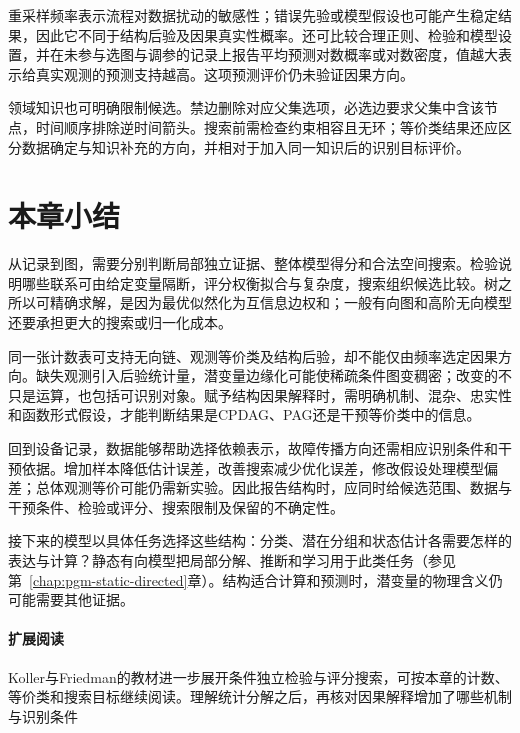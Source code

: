重采样频率表示流程对数据扰动的敏感性；错误先验或模型假设也可能产生稳定结果，因此它不同于结构后验及因果真实性概率。还可比较合理正则、检验和模型设置，并在未参与选图与调参的记录上报告平均预测对数概率或对数密度，值越大表示给真实观测的预测支持越高。这项预测评价仍未验证因果方向。

领域知识也可明确限制候选。禁边删除对应父集选项，必选边要求父集中含该节点，时间顺序排除逆时间箭头。搜索前需检查约束相容且无环；等价类结果还应区分数据确定与知识补充的方向，并相对于加入同一知识后的识别目标评价。

\section{本章小结}
\label{sec:pgm-structure-learning-summary}

从记录到图，需要分别判断局部独立证据、整体模型得分和合法空间搜索。检验说明哪些联系可由给定变量隔断，评分权衡拟合与复杂度，搜索组织候选比较。树之所以可精确求解，是因为最优似然化为互信息边权和；一般有向图和高阶无向模型还要承担更大的搜索或归一化成本。

同一张计数表可支持无向链、观测等价类及结构后验，却不能仅由频率选定因果方向。缺失观测引入后验统计量，潜变量边缘化可能使稀疏条件图变稠密；改变的不只是运算，也包括可识别对象。赋予结构因果解释时，需明确机制、混杂、忠实性和函数形式假设，才能判断结果是CPDAG、PAG还是干预等价类中的信息。

回到设备记录，数据能够帮助选择依赖表示，故障传播方向还需相应识别条件和干预依据。增加样本降低估计误差，改善搜索减少优化误差，修改假设处理模型偏差；总体观测等价可能仍需新实验。因此报告结构时，应同时给候选范围、数据与干预条件、检验或评分、搜索限制及保留的不确定性。

接下来的模型以具体任务选择这些结构：分类、潜在分组和状态估计各需要怎样的表达与计算？静态有向模型把局部分解、推断和学习用于此类任务（参见第~\ref{chap:pgm-static-directed}章）。结构适合计算和预测时，潜变量的物理含义仍可能需要其他证据。

\paragraph{扩展阅读}
Koller与Friedman的教材进一步展开条件独立检验与评分搜索，可按本章的计数、等价类和搜索目标继续阅读。理解统计分解之后，再核对因果解释增加了哪些机制与识别条件
